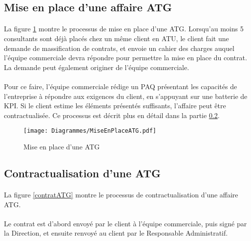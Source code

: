 \subsection{Mise en place d'une affaire ATG}

 \paragraph{} La figure \ref{miseEnPlaceATG} montre le processus de mise en place d'une ATG. Lorsqu'au moins 5 consultants sont déjà placés chez un même client en ATU, le client fait une demande de massification de contrats, et envoie un cahier des charges auquel l'équipe commerciale devra répondre pour permettre la mise en place du contrat. La demande peut également originer de l'équipe commerciale.
 \paragraph{} Pour ce faire, l'équipe commerciale rédige un PAQ présentant les capacités de l'entreprise à répondre aux exigences du client, en s'appuyant sur une batterie de KPI. Si le client estime les éléments présentés suffisants, l'affaire peut être contractualisée. Ce processus est décrit plus en détail dans la partie \ref{subsection:contratATG}.

\begin{figure}[H]
	\centering
	\texttt{[image: Diagrammes/MiseEnPlaceATG.pdf]}
	\caption{Mise en place d'une ATG} 
	\label{miseEnPlaceATG}
\end{figure}


\subsection{Contractualisation d'une ATG}
\label{subsection:contratATG}

\paragraph{} La figure \ref{contratATG} montre le processus de contractualisation d'une affaire ATG.
\paragraph{} Le contrat est d'abord envoyé par le client à l'équipe commerciale, puis signé par la Direction, et ensuite renvoyé au client par le Responsable Administratif. 


